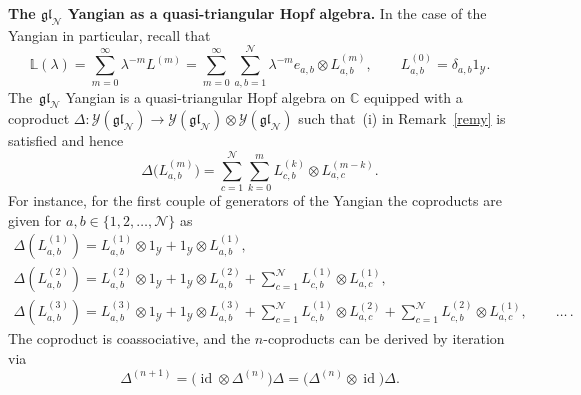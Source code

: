 \documentclass[pdftex]{sigma}
\numberwithin{equation}{section}
\theoremstyle{definition}
\newcommand{\id}{\operatorname{id}}
\begin{document}
{\bf The $\boldsymbol{\mathfrak{gl}_{\mathcal N}}$ Yangian as a quasi-triangular Hopf algebra.} In the case of the Yangian in particular, recall that
\[
{\mathbb L}(\lambda) = \sum_{m=0}^{\infty} \lambda^{-m } L^{(m)}= \sum_{m=0}^{\infty }\sum_{a,b =1}^{\mathcal N} \lambda^{-m}e_{a,b} \otimes L_{a,b}^{(m)}, \qquad L^{(0)}_{a,b} = \delta_{a,b}1_{\mathcal Y}.
\]
The~$\mathfrak{gl}_{\mathcal N}$ Yangian is a quasi-triangular Hopf algebra on ${\mathbb C}$ equipped with a coproduct $\Delta\colon\! {\mathcal Y}(\mathfrak{gl}_{\mathcal N})\! \to{\mathcal Y}(\mathfrak{gl}_{\mathcal N}) \otimes {\mathcal Y}(\mathfrak{gl}_{\mathcal N})$ such that~(i) in Remark~\ref{remy} is satisfied and hence
\begin{equation*}
\Delta\bigl(L^{(m)}_{a,b}\bigr) = \sum_{c=1}^{\mathcal N}\sum_{k=0}^{m} L^{(k)}_{c,b} \otimes L^{(m-k)}_{a,c}.
\end{equation*}
For instance, for the first couple of generators of the Yangian the coproducts are given for $a,b \in \{1,2, \dots, {\mathcal N}\}$ as
\begin{gather*}
\Delta(L_{a,b}^{(1)}) = L_{a,b}^{(1)} \otimes 1_{\mathcal Y} + 1_{\mathcal Y}\otimes
L_{a,b}^{(1)},\\
\Delta(L_{a,b}^{(2)}) = L_{a,b}^{(2)}
\otimes 1_{\mathcal Y}+ 1_{\mathcal Y}\otimes L_{a,b}^{(2)} +
\sum _{c=1}^{\mathcal N}
L_{c,b}^{(1)}\otimes L_{a,c}^{(1)}, \\
\Delta(L_{a,b}^{(3)}) = L_{a,b}^{(3)}
\otimes 1_{\mathcal Y}+ 1_{\mathcal Y}\otimes L_{a,b}^{(3)} +
\sum _{c=1}^{\mathcal N}
L_{c,b}^{(1)}\otimes L_{a,c}^{(2)} +
\sum _{c=1}^{\mathcal N}
L_{c,b}^{(2)}\otimes L_{a,c}^{(1)}, \qquad \dots \,.%
\end{gather*}
The coproduct is {coassociative}, and the $n$-coproducts can be derived by iteration via
\[\Delta^{(n+1)} = \bigl(\id \otimes \Delta^{(n)}\bigr)\Delta = \bigl(\Delta^{(n)} \otimes \id\bigr)\Delta.\]
\end{document}
